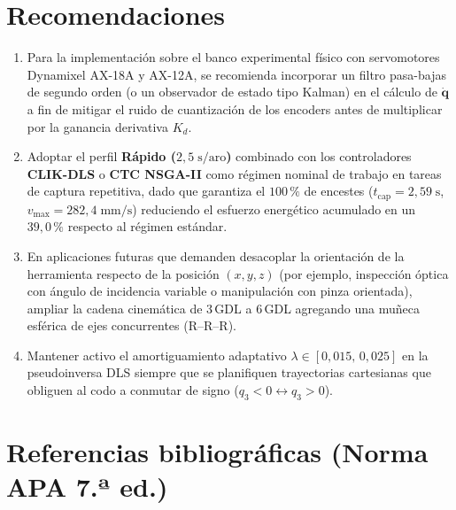 \documentclass[11pt,a4paper]{article}
\newcommand{\qdot}{\dot{\bm{q}}}
\begin{document}
\section{Recomendaciones}

\begin{enumerate}[leftmargin=*, topsep=3pt, itemsep=3pt]
\item Para la implementación sobre el banco experimental físico con servomotores Dynamixel AX-18A y AX-12A, se recomienda incorporar un filtro pasa-bajas de segundo orden (o un observador de estado tipo Kalman) en el cálculo de $\qdot$ a fin de mitigar el ruido de cuantización de los encoders antes de multiplicar por la ganancia derivativa $K_{d}$.

\item Adoptar el perfil \textbf{Rápido ($2{,}5\;\text{s/aro}$)} combinado con los controladores \textbf{CLIK-DLS} o \textbf{CTC NSGA-II} como régimen nominal de trabajo en tareas de captura repetitiva, dado que garantiza el $100\,\%$ de encestes ($t_{\text{cap}}=2{,}59\;\text{s}$, $v_{\max}=282{,}4\;\text{mm/s}$) reduciendo el esfuerzo energético acumulado en un $39{,}0\,\%$ respecto al régimen estándar.

\item En aplicaciones futuras que demanden desacoplar la orientación de la herramienta respecto de la posición $(x,y,z)$ (por ejemplo, inspección óptica con ángulo de incidencia variable o manipulación con pinza orientada), ampliar la cadena cinemática de 3\,GDL a 6\,GDL agregando una muñeca esférica de ejes concurrentes ($\text{R--R--R}$).

\item Mantener activo el amortiguamiento adaptativo $\lambda\in[0{,}015,\,0{,}025]$ en la pseudoinversa DLS siempre que se planifiquen trayectorias cartesianas que obliguen al codo a conmutar de signo ($q_{3}<0\leftrightarrow q_{3}>0$).
\end{enumerate}

\section{Referencias bibliográficas (Norma APA 7.ª ed.)}
\begingroup
\setlength{\parindent}{-1.8em}
\setlength{\leftskip}{1.8em}
\setlength{\parskip}{6pt}
\end{document}
